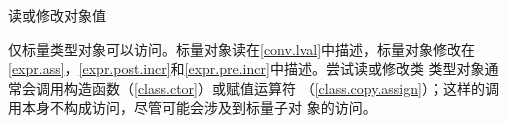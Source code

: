 读或修改对象值

\begin{note}[\noindent]
仅标量类型对象可以访问。标量对象读在\ref{conv.lval}中描述，标量对象修改在
\ref{expr.ass}，\ref{expr.post.incr}和\ref{expr.pre.incr}中描述。尝试读或修改类
类型对象通常会调用构造函数（\ref{class.ctor}）或赋值运算符
（\ref{class.copy.assign}）；这样的调用本身不构成访问，尽管可能会涉及到标量子对
象的访问。
\end{note}
